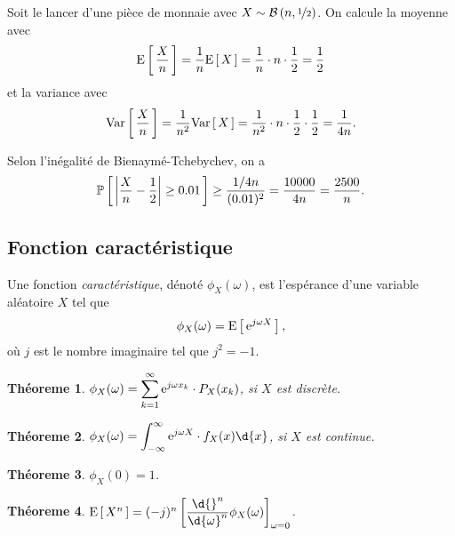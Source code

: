 \documentclass[11pt]{article}
\renewcommand\P[1]{%
	\ensuremath{%
		\mathbb{P}\left[\,#1\,\right]%
	}%
}%
\newcommand\e{%
	\ensuremath{%
		\mathrm{e}%
	}%
}%
\newcommand\Bin[2]{%
	\ensuremath{%
		\mathcal{B}\left(#1,#2\right)%
	}%
}%
\newcommand\Esp[1]{%
	\ensuremath{%
		\mathrm{E}\left[\,#1\,\right]%
	}%
}%
\newcommand\Var[1]{%
	\ensuremath{%
		\mathrm{Var}\left[\,#1\,\right]%
	}%
}%
\newtheorem{theoreme}{Théoreme}[section]
\begin{document}
\begin{exemple}
	Soit le lancer d'une pièce de monnaie avec $X\sim\Bin{n}{\nicefrac{1}{2}}$.
	On calcule la moyenne avec
	\begin{equation*}
		\Esp{\frac{X}{n}}
		=\frac{1}{n}\Esp{X}
		=\frac{1}{n}\cdot n\cdot\frac{1}{2}
		=\frac{1}{2}
	\end{equation*}
	et la variance avec
	\begin{equation*}
		\Var{\frac{X}{n}}
		=\frac{1}{n^2}\Var{X}
		=\frac{1}{n^2}\cdot n\cdot\frac{1}{2}\cdot\frac{1}{2}
		=\frac{1}{4n}.
	\end{equation*}

	Selon l'inégalité de Bienaymé-Tchebychev, on a
	\begin{equation*}
		\P{\left|\frac{X}{n}-\frac{1}{2}\right|\geq 0.01}
		\geq\frac{1/4n}{(0.01)^2}
		=\frac{10000}{4n}
		=\frac{2500}{n}.
	\end{equation*}
\end{exemple}

\subsection{Fonction caractéristique}
\begin{definition}
	Une fonction \textit{caractéristique}, dénoté $\phi_X(\omega)$, est
	l'espérance d'une variable aléatoire $X$ tel que
	\begin{equation*}
		\phi_X(\omega)=\Esp{\e^{j\omega X}},
	\end{equation*}
	où $j$ est le nombre imaginaire tel que $j^2=-1$.
\end{definition}

\begin{theoreme}
	$\phi_X(\omega)=\displaystyle\sum_{k=1}^\infty\e^{j\omega x_k}\cdot
	P_X(x_k)$, si $X$ est discrète.
\end{theoreme}

\begin{theoreme}
	$\phi_X(\omega)=\displaystyle\int_{-\infty}^\infty\e^{j\omega X}\cdot
	f_X(x)\d{x}$, si $X$ est continue.
\end{theoreme}

\begin{theoreme}
	$\phi_X(0)=1$.
\end{theoreme}

\begin{theoreme}
	$\Esp{X^n}=(-j)^n\left[
	\dfrac{\d{}^n}{\d{\omega}^n}\phi_X(\omega)\right]_{\omega=0}$.
\end{theoreme}
\end{document}
